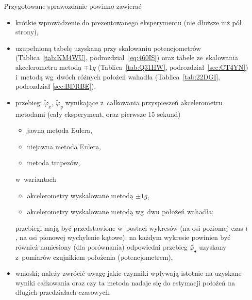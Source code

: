 \documentclass[paper=a4,DIV=12]{tmmlab}
\begin{document}
Przygotowane sprawozdanie powinno zawierać
\begin{itemize}
  \item krótkie wprowadzenie do prezentowanego eksperymentu (nie dłuższe niż
    pół strony),
  \item uzupełnioną tabelę uzyskaną przy skalowaniu potencjometrów
    (Tablica~\ref{tab:KM4WU}, podrozdział~\ref{eq:460IS}) oraz tabele
    ze~skalowania akcelerometru metodą $\mp 1g$ (Tablica~\ref{tab:Q31HW},
    podrozdział~\ref{sec:CT4YN}) i~metodą wg~dwóch różnych położeń wahadła
    (Tablica~\ref{tab:22DGI}, podrozdział \ref{sec:BDRBE}),
  \item przebiegi $\tilde{\varphi}_x$, $\tilde{\varphi}_y$ wynikające
    z~całkowania przyspieszeń akcelerometru metodami (cały eksperyment, oraz
    pierwsze $15$ sekund)
    \begin{itemize}
      \item jawna metoda Eulera,
      \item niejawna metoda Eulera,
      \item metoda trapezów,
    \end{itemize}
    w~wariantach
    \begin{itemize}
      \item akcelerometry wyskalowane metodą $\pm 1g$,
      \item akcelerometry wyskalowane metodą wg~dwu położeń wahadła;
    \end{itemize}
    przebiegi mają być przedstawione w~postaci wykresów (na osi poziomej czas
    $t$, na osi pionowej wychylenie kątowe); na każdym wykresie powinien być
    również naniesiony (dla porównania) odpowiedni przebieg
    $\bar{\varphi}_{\bullet}$ uzyskany z~pomiarów czujnikiem położenia
    (potencjometrem),
  \item wnioski; należy zwrócić uwagę jakie czynniki wpływają istotnie na
    uzyskane wyniki całkowania oraz czy ta metoda nadaje się do estymacji
    położeń na długich przedziałach czasowych.
\end{itemize}
\end{document}
